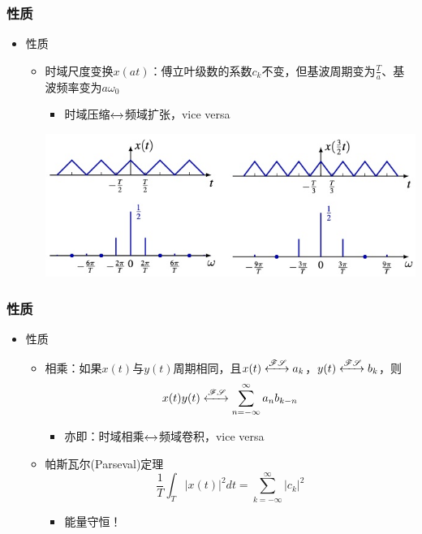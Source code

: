 \documentclass[CJKutf8,xcolor=pdftex,dvipsnames,table]{beamer}
\begin{document}
\begin{CJK*}{UTF8}{song}
  \begin{frame}
    \frametitle{性质}
    \begin{itemize}
    \item 性质
    	\begin{itemize}
		\item 时域尺度变换$x(at)$：傅立叶级数的系数$c_k$不变，但基波周期变为$\frac{T}{a}$、基波频率变为$a\omega_0$
			\begin{itemize}
			\item 时域压缩$\xleftrightarrow{}$频域扩张，vice versa
			\end{itemize}
			\begin{center}
      		\includegraphics[scale=.5]{timescaling}
    		\end{center}
    	\end{itemize}
	\end{itemize}
  \end{frame}     
    
  \begin{frame}
    \frametitle{性质}
    \begin{itemize}
    \item 性质
    	\begin{itemize}
		\item 相乘：如果$x(t)$与$y(t)$周期相同，且$x(t) \xleftrightarrow{\mathscr{FS}} a_k$，$y(t) \xleftrightarrow{\mathscr{FS}} b_k$，则\[x(t)y(t) \xleftrightarrow{\mathscr{FS}} \sum_{n=-\infty}^{\infty}a_n b_{k-n}\]
			\begin{itemize}
			\item 亦即：时域相乘$\xleftrightarrow{}$频域卷积，vice versa
			\end{itemize}
		\item 帕斯瓦尔(Parseval)定理\[ \frac{1}{T}\int_{T}|x(t)|^2dt = \sum_{k=-\infty}^{\infty} |c_k|^2 \]
			\begin{itemize}
			\item 能量守恒！
			\end{itemize}
    	\end{itemize}
	\end{itemize}
  \end{frame}        
    

\end{CJK*}
\end{document}
